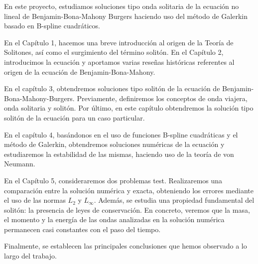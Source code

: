 \begin{resumen}

En este proyecto, estudiamos soluciones tipo onda solitaria de la ecuación no lineal de Benjamin-Bona-Mahony Burgers haciendo uso del método de Galerkin basado en B-spline cuadráticos.

En el Capítulo 1, hacemos una breve introducción al origen de la Teoría de Solitones, así como el surgimiento del término solitón.
En el Capítulo 2, introducimos la ecuación y aportamos varias reseñas históricas referentes al origen de la ecuación de Benjamin-Bona-Mahony.

En el capítulo 3, obtendremos soluciones tipo solitón de la ecuación de Benjamin-Bona-Mahony-Burgers. Previamente, definiremos los conceptos de onda viajera, onda solitaria y solitón. Por último, en este capítulo obtendremos la solución tipo solitón de la ecuación para un caso particular.

En el capítulo 4, basándonos en el uso de funciones B-spline cuadráticas y el método de Galerkin, obtendremos soluciones numéricas de la ecuación y estudiaremos la estabilidad de las mismas, haciendo uso de la teoría de von Neumann.

En el Capítulo 5, consideraremos dos problemas test. Realizaremos una comparación entre la solución numérica y exacta, obteniendo los errores mediante el uso de las normas $L_{2}$ y $L_{\infty}$. Además, se estudia una propiedad fundamental del solitón: la presencia de leyes de conservación. En concreto, veremos que la masa, el momento y la energía de las
ondas analizadas en la solución numérica permanecen casi constantes con el paso del tiempo.

Finalmente, se establecen las principales conclusiones que hemos observado a lo largo del trabajo.

\end{resumen}

